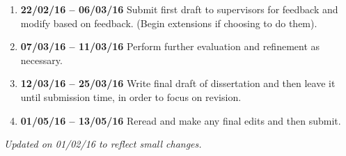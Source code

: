 \documentclass[12pt,a4paper,twoside]{article}
\begin{document}
\begin{enumerate}
\item {\bf 22/02/16 -- 06/03/16} Submit first draft to supervisors for feedback and modify based on feedback. (Begin extensions if choosing to do them).

\item {\bf 07/03/16 -- 11/03/16} Perform further evaluation and refinement as necessary.

\item {\bf 12/03/16 -- 25/03/16} Write final draft of dissertation and then leave it until submission time, in order to focus on revision.

\item {\bf 01/05/16 -- 13/05/16} Reread and make any final edits and then submit.

\end{enumerate}

\textit{Updated on 01/02/16 to reflect small changes.}
\end{document}
